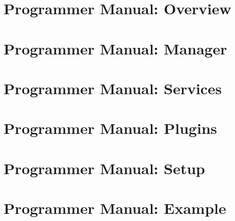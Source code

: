 
\chapter[DABC Programmer Manual: Overview]{\dabc\ Programmer Manual: Overview}
 \cleardoublepage
% 
\chapter[DABC Programmer Manual: Manager]{\dabc\ Programmer Manual: Manager}
 \cleardoublepage
\chapter[DABC Programmer Manual: Services]{\dabc\ Programmer Manual: Services}
 \cleardoublepage
\chapter[DABC Programmer Manual: Plugins]{\dabc\ Programmer Manual: Plugins}
 \cleardoublepage


\chapter[DABC Programmer Manual: Setup]{\dabc\ Programmer Manual: Setup}
 \cleardoublepage
\chapter[DABC Programmer Manual: Example MBS]{\dabc\ Programmer Manual: Example \mbs}
 \cleardoublepage
